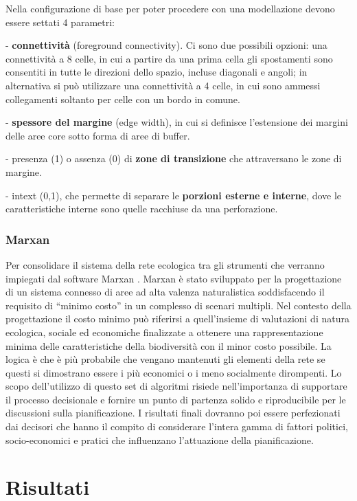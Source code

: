 \documentclass[
]{book}
\begin{document}
Nella configurazione di base per poter procedere con una modellazione devono essere settati 4 parametri:

- \textbf{connettività} (foreground connectivity).
Ci sono due possibili opzioni: una connettività a 8 celle, in cui a partire da una prima cella gli spostamenti sono consentiti in tutte le direzioni dello spazio, incluse diagonali e angoli; in alternativa si può utilizzare una connettività a 4 celle, in cui sono ammessi collegamenti soltanto per celle con un bordo in comune.

- \textbf{spessore del margine} (edge width), in cui si definisce l'estensione dei margini delle aree core sotto forma di aree di buffer.

- presenza (1) o assenza (0) di \textbf{zone di transizione} che attraversano le zone di margine.

- intext (0,1), che permette di separare le \textbf{porzioni esterne e interne}, dove le caratteristiche interne sono quelle racchiuse da una perforazione.

\subsection{Marxan}\label{marxan}

Per consolidare il sistema della rete ecologica tra gli strumenti che verranno impiegati dal software Marxan \citep{ardronMarxanGoodPractices2010}.
Marxan è stato sviluppato per la progettazione di un sistema connesso di aree ad alta valenza naturalistica soddisfacendo il requisito di ``minimo costo'' in un complesso di scenari multipli.
Nel contesto della progettazione il costo minimo può riferirsi a quell'insieme di valutazioni di natura ecologica, sociale ed economiche finalizzate a ottenere una rappresentazione minima delle caratteristiche della biodiversità con il minor costo possibile.
La logica è che è più probabile che vengano mantenuti gli elementi della rete se questi si dimostrano essere i più economici o i meno socialmente dirompenti.
Lo scopo dell'utilizzo di questo set di algoritmi risiede nell'importanza di supportare il processo decisionale e fornire un punto di partenza solido e riproducibile per le discussioni sulla pianificazione.
I risultati finali dovranno poi essere perfezionati dai decisori che hanno il compito di considerare l'intera gamma di fattori politici, socio-economici e pratici che influenzano l'attuazione della pianificazione.

\chapter{Risultati}\label{risultati}
\end{document}
